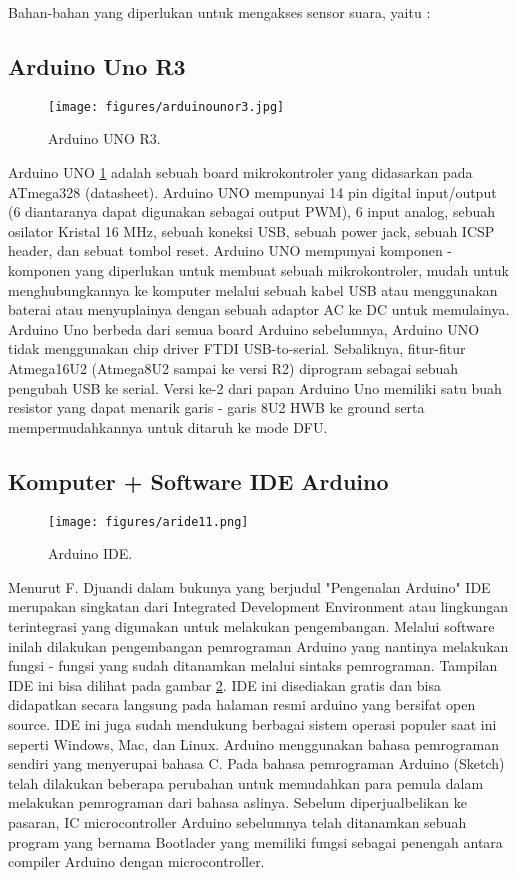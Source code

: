 \hspace{4mm} Bahan-bahan yang diperlukan untuk mengakses sensor suara, yaitu :

\subsection{Arduino Uno R3}
\begin{figure}[ht]
\centerline{\texttt{[image: figures/arduinounor3.jpg]}}
\caption{Arduino UNO R3.}
\label{arduinounor3}
\end{figure}
Arduino UNO \ref{arduinounor3} adalah sebuah board mikrokontroler yang didasarkan pada ATmega328 (datasheet). Arduino UNO mempunyai 14 pin digital input/output (6 diantaranya dapat digunakan sebagai output PWM), 6 input analog, sebuah osilator Kristal 16 MHz, sebuah koneksi USB, sebuah power jack, sebuah ICSP header, dan sebuat tombol reset. Arduino UNO mempunyai komponen - komponen yang diperlukan untuk membuat sebuah mikrokontroler, mudah untuk menghubungkannya ke komputer melalui sebuah kabel USB atau menggunakan baterai atau menyuplainya dengan sebuah adaptor AC ke DC untuk memulainya.
Arduino Uno berbeda dari semua board Arduino sebelumnya, Arduino UNO tidak menggunakan chip driver FTDI USB-to-serial. Sebaliknya, fitur-fitur Atmega16U2 (Atmega8U2 sampai ke versi R2) diprogram sebagai sebuah pengubah USB ke serial. Versi ke-2 dari papan Arduino Uno memiliki satu buah resistor yang dapat menarik garis - garis 8U2 HWB ke ground serta mempermudahkannya untuk ditaruh ke mode DFU.
\subsection{Komputer + Software IDE Arduino}
\begin{figure}[ht]
\centerline{\texttt{[image: figures/aride11.png]}}
\caption{Arduino IDE.}
\label{ssaide}
\end{figure}
Menurut F. Djuandi dalam bukunya yang berjudul "Pengenalan Arduino" \cite{djuandi2011pengenalan} IDE merupakan singkatan dari Integrated Development Environment atau lingkungan terintegrasi yang digunakan untuk melakukan pengembangan. Melalui software inilah dilakukan pengembangan pemrograman Arduino yang nantinya melakukan fungsi - fungsi yang sudah ditanamkan melalui sintaks pemrograman. Tampilan IDE ini bisa dilihat pada gambar \ref{ssaide}. IDE ini disediakan gratis dan bisa didapatkan secara langsung pada halaman resmi arduino yang bersifat open source. IDE ini juga sudah mendukung berbagai sistem operasi populer saat ini seperti Windows, Mac, dan Linux. Arduino menggunakan bahasa pemrograman sendiri yang menyerupai bahasa C. Pada bahasa pemrograman Arduino (Sketch) telah dilakukan beberapa perubahan untuk memudahkan para pemula dalam melakukan pemrograman dari bahasa aslinya. Sebelum diperjualbelikan ke pasaran, IC microcontroller Arduino sebelumnya telah ditanamkan sebuah program yang bernama Bootlader yang memiliki fungsi sebagai penengah antara compiler Arduino dengan microcontroller.

